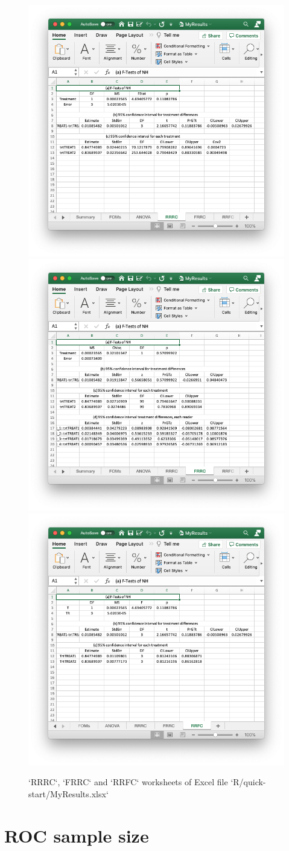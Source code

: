 \documentclass[
]{book}
\begin{document}
\begin{figure}

{\centering \includegraphics[width=0.5\linewidth,height=0.2\textheight]{R/quick-start/MyResultsRRRC} \includegraphics[width=0.5\linewidth,height=0.2\textheight]{R/quick-start/MyResultsFRRC} \includegraphics[width=0.5\linewidth,height=0.2\textheight]{R/quick-start/MyResultsRRFC} 

}

\caption{`RRRC`, `FRRC` and `RRFC` worksheets of Excel file `R/quick-start/MyResults.xlsx`}\label{fig:quick-start-or-xlsx3}
\end{figure}

\hypertarget{part-roc-sample-size}{%
\part*{ROC sample size}\label{part-roc-sample-size}}
\end{document}
